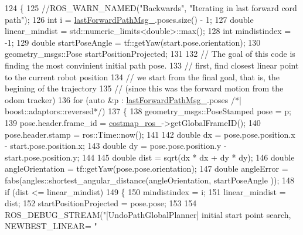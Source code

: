 \begin{DoxyCode}
124         \{
125             \textcolor{comment}{//ROS\_WARN\_NAMED("Backwards", "Iterating in last forward cord path");}
126             \textcolor{keywordtype}{int} i = \hyperlink{classcl__move__base__z_1_1undo__path__global__planner_1_1UndoPathGlobalPlanner_a9a4a6e40f5b6cb5f77dedbc5b6170871}{lastForwardPathMsg\_}.poses.size() - 1;
127             \textcolor{keywordtype}{double} linear\_mindist = std::numeric\_limits<double>::max();
128             \textcolor{keywordtype}{int} mindistindex = -1;
129             \textcolor{keywordtype}{double} startPoseAngle = tf::getYaw(start.pose.orientation);
130             geometry\_msgs::Pose startPositionProjected;
131 
132             \textcolor{comment}{// The goal of this code is finding the most convinient initial path pose.}
133             \textcolor{comment}{// first, find closest linear point to the current robot position}
134             \textcolor{comment}{// we start from the final goal, that is, the begining of the trajectory}
135             \textcolor{comment}{// (since this was the forward motion from the odom tracker)}
136             \textcolor{keywordflow}{for} (\textcolor{keyword}{auto} &p : \hyperlink{classcl__move__base__z_1_1undo__path__global__planner_1_1UndoPathGlobalPlanner_a9a4a6e40f5b6cb5f77dedbc5b6170871}{lastForwardPathMsg\_}.poses \textcolor{comment}{/*| boost::adaptors::reversed*/})
137             \{
138                 geometry\_msgs::PoseStamped pose = p;
139                 pose.header.frame\_id = \hyperlink{classcl__move__base__z_1_1undo__path__global__planner_1_1UndoPathGlobalPlanner_ab63eeb465e3ae989a6edcc4d059cf8f0}{costmap\_ros\_}->getGlobalFrameID();
140                 pose.header.stamp = ros::Time::now();
141 
142                 \textcolor{keywordtype}{double} dx = pose.pose.position.x - start.pose.position.x;
143                 \textcolor{keywordtype}{double} dy = pose.pose.position.y - start.pose.position.y;
144 
145                 \textcolor{keywordtype}{double} dist = sqrt(dx * dx + dy * dy);
146                 \textcolor{keywordtype}{double} angleOrientation = tf::getYaw(pose.pose.orientation);
147                 \textcolor{keywordtype}{double} angleError = fabs(angles::shortest\_angular\_distance(angleOrientation, startPoseAngle
      ));
148                 \textcolor{keywordflow}{if} (dist <= linear\_mindist)
149                 \{
150                     mindistindex = i;
151                     linear\_mindist = dist;
152                     startPositionProjected = pose.pose;
153 
154                     ROS\_DEBUG\_STREAM(\textcolor{stringliteral}{"[UndoPathGlobalPlanner] initial start point search, NEWBEST\_LINEAR= "}

\end{DoxyCode}
